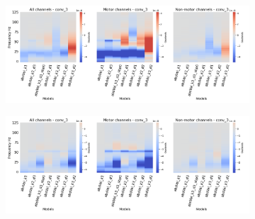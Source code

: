 \begin{figure}[!hpbp]
\begin{subfigure}[a]{\textwidth}
   \includegraphics[width=1\linewidth]{img/ch4/absVel-conv-3-layer-grads}
   \caption{}
\end{subfigure}\label{fig:absVel-conv-3-layer-grads}

\begin{subfigure}[b]{\textwidth}
   \includegraphics[width=1\linewidth]{img/ch4/absVel-conv-3-layer-grads-shifted}
   \caption{}
\end{subfigure}\label{fig:absVel-conv-3-layer-grads-shifted}
\caption[]{}
\end{figure}\label{fig:shifted-vs-non-shifted-grads}


